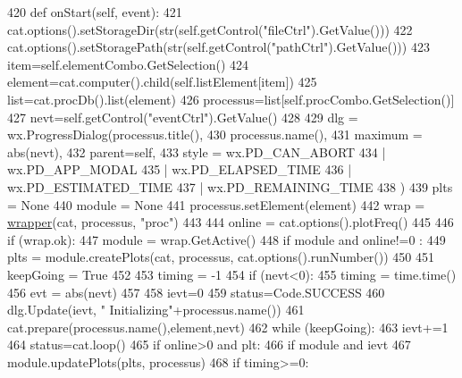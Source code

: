 \begin{DoxyCode}
420     \textcolor{keyword}{def }onStart(self, event):
421         cat.options().setStorageDir(str(self.getControl(\textcolor{stringliteral}{"fileCtrl"}).GetValue()))
422         cat.options().setStoragePath(str(self.getControl(\textcolor{stringliteral}{"pathCtrl"}).GetValue()))
423         item=self.elementCombo.GetSelection()
424         element=cat.computer().child(self.listElement[item])
425         list=cat.procDb().list(element)
426         processus=list[self.procCombo.GetSelection()]
427         nevt=self.getControl(\textcolor{stringliteral}{"eventCtrl"}).GetValue()
428 
429         dlg = wx.ProgressDialog(processus.title(),
430                                 processus.name(),
431                                 maximum = abs(nevt),
432                                 parent=self,
433                                 style = wx.PD\_CAN\_ABORT
434                                 | wx.PD\_APP\_MODAL
435                                 | wx.PD\_ELAPSED\_TIME
436                                 | wx.PD\_ESTIMATED\_TIME
437                                 | wx.PD\_REMAINING\_TIME
438                                 )
439         plts   = \textcolor{keywordtype}{None}
440         module = \textcolor{keywordtype}{None}
441         processus.setElement(element)
442         wrap = \hyperlink{namespacewrapper}{wrapper}(cat, processus, \textcolor{stringliteral}{"proc"})
443 
444         online  = cat.options().plotFreq()
445         
446         \textcolor{keywordflow}{if} (wrap.ok):
447             module = wrap.GetActive()
448             \textcolor{keywordflow}{if} module \textcolor{keywordflow}{and} online!=0 :
449                 plts = module.createPlots(cat, processus, cat.options().runNumber())        
450 
451         keepGoing = \textcolor{keyword}{True}
452 
453         timing = -1
454         \textcolor{keywordflow}{if} (nevt<0):
455             timing = time.time()
456         evt    = abs(nevt)
457 
458         ievt=0 
459         status=Code.SUCCESS
460         dlg.Update(ievt, \textcolor{stringliteral}{" Initializing"}+processus.name())
461         cat.prepare(processus.name(),element,nevt)
462         \textcolor{keywordflow}{while} (keepGoing):
463             ievt+=1
464             status=cat.loop()
465             \textcolor{keywordflow}{if} online>0 \textcolor{keywordflow}{and} plt:
466                 \textcolor{keywordflow}{if} module \textcolor{keywordflow}{and} ievt%
467                     module.updatePlots(plts, processus)
468             \textcolor{keywordflow}{if} timing>=0:

\end{DoxyCode}
